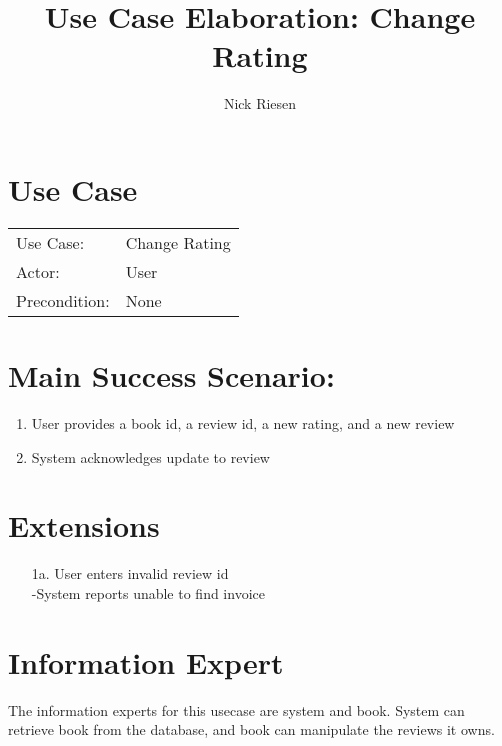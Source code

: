 \documentclass{article}
\title{Use Case Elaboration: Change Rating}
\author{ Nick Riesen }
\begin{document}
\maketitle


\section*{Use Case}
\begin{tabular}{l l}
Use Case:     & Change Rating                 \\
Actor:        & User                          \\
Precondition: & None                          \\
\end{tabular}


\section*{Main Success Scenario:}

\begin{enumerate}
    \item  User provides a book id, a review id, a new rating, and a new review
    \item System acknowledges update to review

\end{enumerate}

\section*{Extensions}

\begin{itemize}
    \item [1a.] User enters invalid review id \\
        -System reports unable to find invoice

\end{itemize}

\section*{Information Expert}

The information experts for this usecase are system and book. System can retrieve book from the database, and book can manipulate the reviews it owns. 
\end{document}
